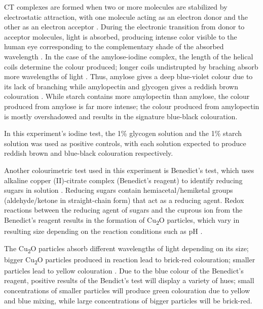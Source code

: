     CT complexes are formed when two or more molecules are stabilized by electrostatic attraction, with one molecule acting as an electron donor and the other as an electron acceptor \parencite{Aly2014}.
    During the electronic transition from donor to acceptor molecules, light is absorbed, producing intense color visible to the human eye corresponding to the complementary shade of the absorbed wavelength \parencite{Calatayud2013, Goedecke2016}.
    In the case of the amylose-iodine complex, the length of the helical coils determine the colour produced; longer coils undistrupted by braching absorb more wavelengths of light \parencite{Brust2020}. 
    Thus, amylose gives a deep blue-violet colour due to its lack of branching while amylopectin and glycogen gives a reddish brown colouration \parencite{Ball2011}. 
    While starch contains more amylopectin than amylose, the colour produced from amylose is far more intense; the colour produced from amylopectin is mostly overshadowed and results in the signature blue-black colouration. \par

    In this experiment's iodine test, the 1\% glycogen solution and the 1\% starch solution was used as positive controls, with each solution expected to produce reddish brown and blue-black colouration respectively. \par

    Another colourimetric test used in this experiment is Benedict's test, which uses alkaline copper (II)-citrate complex (Benedict's reagent) to identify reducing sugars in solution \parencite{Markina2016}.
    Reducing sugars contain hemiacetal/hemiketal groups (aldehyde/ketone in straight-chain form) that act as a reducing agent.
    Redox reactions between the reducing agent of sugars and the cuprous ion from the Benedict's reagent results in the formation of Cu\textsubscript{2}O particles, which vary in resulting size depending on the reaction conditions such as pH \parencite{Markina2016}. 

    The Cu\textsubscript{2}O particles absorb different wavelengths of light depending on its size; bigger Cu\textsubscript{2}O particles produced in reaction lead to brick-red colouration; smaller particles lead to yellow colouration \parencite{Markina2016}.
    Due to the blue colour of the Benedict's reagent, positive results of the Bendict's test will display a variety of hues; small concentrations of smaller particles will produce green colouration due to yellow and blue mixing, while large concentrations of bigger particles will be brick-red.

